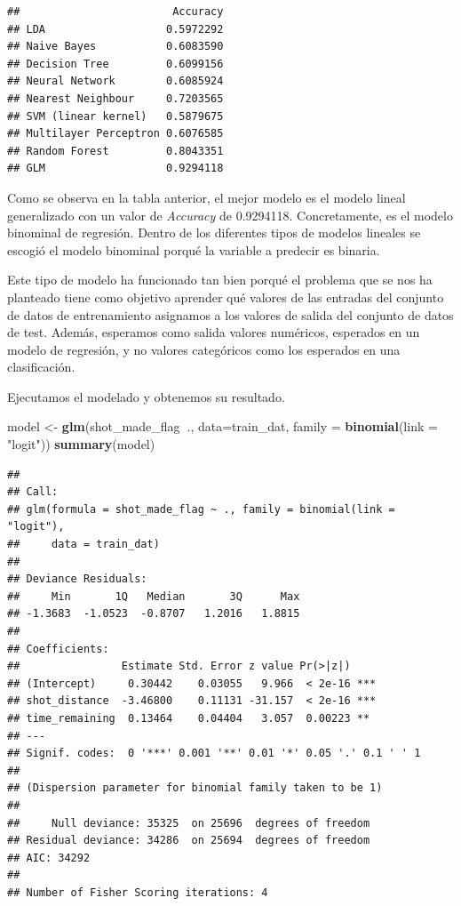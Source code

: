 \documentclass[
]{article}
\newenvironment{Shaded}{\begin{snugshade}}{\end{snugshade}}
\newcommand{\DataTypeTok}[1]{\textcolor[rgb]{0.13,0.29,0.53}{#1}}
\newcommand{\KeywordTok}[1]{\textcolor[rgb]{0.13,0.29,0.53}{\textbf{#1}}}
\newcommand{\NormalTok}[1]{#1}
\newcommand{\OperatorTok}[1]{\textcolor[rgb]{0.81,0.36,0.00}{\textbf{#1}}}
\newcommand{\StringTok}[1]{\textcolor[rgb]{0.31,0.60,0.02}{#1}}
\begin{document}
\newpage

\begin{verbatim}
##                        Accuracy
## LDA                   0.5972292
## Naive Bayes           0.6083590
## Decision Tree         0.6099156
## Neural Network        0.6085924
## Nearest Neighbour     0.7203565
## SVM (linear kernel)   0.5879675
## Multilayer Perceptron 0.6076585
## Random Forest         0.8043351
## GLM                   0.9294118
\end{verbatim}

Como se observa en la tabla anterior, el mejor modelo es el modelo
lineal generalizado con un valor de \emph{Accuracy} de 0.9294118.
Concretamente, es el modelo binominal de regresión. Dentro de los
diferentes tipos de modelos lineales se escogió el modelo binominal
porqué la variable a predecir es binaria.

Este tipo de modelo ha funcionado tan bien porqué el problema que se nos
ha planteado tiene como objetivo aprender qué valores de las entradas
del conjunto de datos de entrenamiento asignamos a los valores de salida
del conjunto de datos de test. Además, esperamos como salida valores
numéricos, esperados en un modelo de regresión, y no valores categóricos
como los esperados en una clasificación.

Ejecutamos el modelado y obtenemos su resultado.

\begin{Shaded}
\begin{Highlighting}[]
\NormalTok{model <-}\StringTok{ }\KeywordTok{glm}\NormalTok{(shot_made_flag}\OperatorTok{~}\NormalTok{., }\DataTypeTok{data=}\NormalTok{train_dat, }\DataTypeTok{family =} \KeywordTok{binomial}\NormalTok{(}\DataTypeTok{link =} \StringTok{"logit"}\NormalTok{))}
\KeywordTok{summary}\NormalTok{(model)}
\end{Highlighting}
\end{Shaded}

\begin{verbatim}
## 
## Call:
## glm(formula = shot_made_flag ~ ., family = binomial(link = "logit"), 
##     data = train_dat)
## 
## Deviance Residuals: 
##     Min       1Q   Median       3Q      Max  
## -1.3683  -1.0523  -0.8707   1.2016   1.8815  
## 
## Coefficients:
##                Estimate Std. Error z value Pr(>|z|)    
## (Intercept)     0.30442    0.03055   9.966  < 2e-16 ***
## shot_distance  -3.46800    0.11131 -31.157  < 2e-16 ***
## time_remaining  0.13464    0.04404   3.057  0.00223 ** 
## ---
## Signif. codes:  0 '***' 0.001 '**' 0.01 '*' 0.05 '.' 0.1 ' ' 1
## 
## (Dispersion parameter for binomial family taken to be 1)
## 
##     Null deviance: 35325  on 25696  degrees of freedom
## Residual deviance: 34286  on 25694  degrees of freedom
## AIC: 34292
## 
## Number of Fisher Scoring iterations: 4
\end{verbatim}
\end{document}
